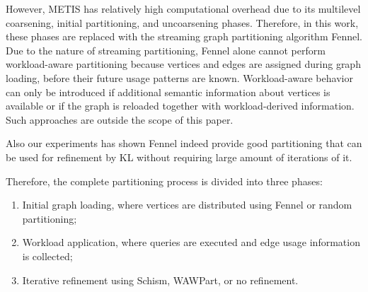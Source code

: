 However, METIS has relatively high computational overhead due to its multilevel coarsening, initial partitioning, and uncoarsening phases. Therefore, in this work, these phases are replaced with the streaming graph partitioning algorithm Fennel. Due to the nature of streaming partitioning, Fennel alone cannot perform workload-aware partitioning because vertices and edges are assigned during graph loading, before their future usage patterns are known. Workload-aware behavior can only be introduced if additional semantic information about vertices is available or if the graph is reloaded together with workload-derived information. Such approaches are outside the scope of this paper.

Also our experiments has shown Fennel indeed provide good partitioning that can be used for refinement by KL without requiring large amount of iterations of it.

Therefore, the complete partitioning process is divided into three phases:

\begin{enumerate}
\item Initial graph loading, where vertices are distributed using Fennel or random partitioning;
\item Workload application, where queries are executed and edge usage information is collected;
\item Iterative refinement using Schism, WAWPart, or no refinement.
\end{enumerate}
